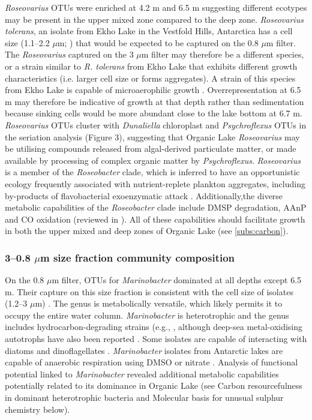 \emph{Roseovarius} \acp{OTU} were enriched at 4.2 m and 6.5 m suggesting different ecotypes may be present in the upper mixed zone compared to the deep zone. 
\emph{Roseovarius tolerans}, an isolate from Ekho Lake in the Vestfold Hills, Antarctica has a cell size (1.1--2.2 $\mu$m; \cite{Labrenz1999}) that would be expected to be captured on the 0.8 $\mu$m filter. 
The \emph{Roseovarius} captured on the 3 $\mu$m filter may therefore be a different species, or a strain similar to \emph{R. tolerans} from Ekho Lake that exhibits different growth characteristics (i.e. larger cell size or forms aggregates). 
A strain of this species from Ekho Lake is capable of microaerophilic growth \cite{Labrenz1999}. 
Overrepresentation at 6.5 m may therefore be indicative of growth at that depth rather than sedimentation because sinking cells would be more abundant close to the lake bottom at 6.7 m. 
\emph{Roseovarius} \acp{OTU} cluster with \emph{Dunaliella} chloroplast and \emph{Psychroflexus} \acp{OTU} in the seriation analysis (Figure 3), suggesting that Organic Lake \emph{Roseovarius} may be utilising compounds released from algal-derived particulate matter, or made available by processing of complex organic matter by \emph{Psychroflexus}.
\emph{Roseovarius} is a member of the \emph{Roseobacter} clade, which is inferred to have an opportunistic ecology frequently associated with nutrient-replete plankton aggregates, including by-products of flavobacterial exoenzymatic attack \cite{Moran2007a, Teeling2012}. 
Additionally,the diverse metabolic capabilities of the \emph{Roseobacter} clade include \ac{DMSP} degradation, \ac{AAnP} and CO oxidation (reviewed in \citet{Wagner-Dobler2006}). 
All of these capabilities should facilitate growth in both the upper mixed and deep zones of Organic Lake (see \ref{subs:carbon}).

\subsubsection{3--0.8 $\mu$m size fraction community composition}
On the 0.8 $\mu$m filter, \acp{OTU} for \emph{Marinobacter} dominated at all depths except 6.5 m. 
Their capture on this size fraction is consistent with the cell size of isolates (1.2--3 $\mu$m) \cite{Gauthier1992}. 
The genus is metabolically versatile, which likely permits it to occupy the entire water column. 
\emph{Marinobacter} is heterotrophic and the genus includes hydrocarbon-degrading strains (e.g., \citet{Gauthier1992, Huu1999}, although deep-sea metal-oxidising autotrophs have also been reported \cite{Edwards2003}. 
Some isolates are capable of interacting with diatoms \cite{Gardes2010} and dinoflagellates \cite{Green2006}. 
\emph{Marinobacter} isolates from Antarctic lakes are capable of anaerobic respiration using \ac{DMSO} \cite{Matsuzaki2006} or nitrate \cite{Ward1997}. 
Analysis of functional potential linked to \emph{Marinobacter} revealed additional metabolic capabilities potentially related to its dominance in Organic Lake 
(see Carbon resourcefulness in dominant heterotrophic bacteria and Molecular basis for unusual sulphur chemistry below).%

